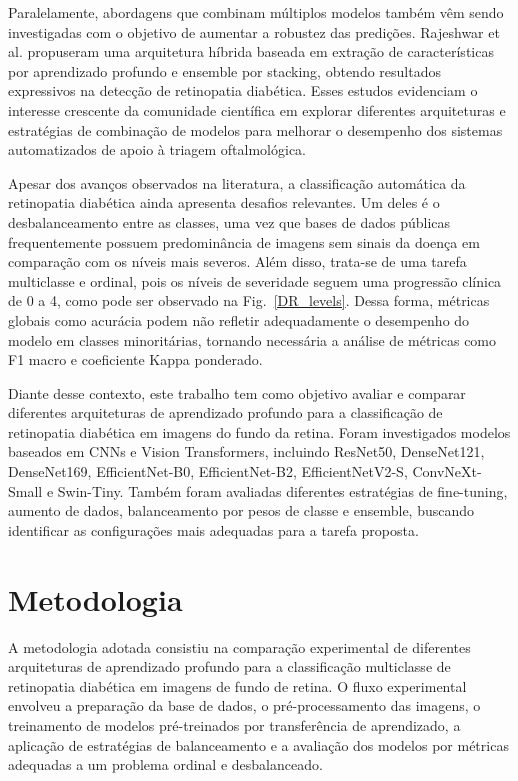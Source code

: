 \documentclass[conference]{IEEEtran}
\begin{document}
Paralelamente, abordagens que combinam múltiplos modelos também vêm
sendo investigadas com o objetivo de aumentar a robustez das
predições. Rajeshwar et al. \cite{rajeshwar2025} propuseram uma
arquitetura híbrida baseada em extração de características por
aprendizado profundo e ensemble por stacking, obtendo resultados
expressivos na detecção de retinopatia diabética. Esses estudos
evidenciam o interesse crescente da comunidade científica em explorar
diferentes arquiteturas e estratégias de combinação de modelos
para melhorar o desempenho dos sistemas automatizados de apoio à
triagem oftalmológica.

Apesar dos avanços observados na literatura, a classificação
automática da retinopatia diabética ainda apresenta desafios
relevantes. Um deles é o desbalanceamento entre as classes, uma vez
que bases de dados públicas frequentemente possuem predominância de
imagens sem sinais da doença em comparação com os níveis
mais severos. Além disso, trata-se de uma tarefa multiclasse e
ordinal, pois os níveis de severidade seguem uma progressão clínica
de 0 a 4, como pode ser observado na Fig.~\ref{DR_levels}. Dessa forma,
métricas globais como acurácia podem não refletir adequadamente o
desempenho do modelo em classes minoritárias, tornando necessária a
análise de métricas como F1 macro e coeficiente Kappa ponderado.

Diante desse contexto, este trabalho tem como objetivo avaliar e comparar
diferentes arquiteturas de aprendizado profundo para a classificação
de retinopatia diabética em imagens do fundo da retina. Foram
investigados modelos baseados em CNNs e Vision Transformers, incluindo
ResNet50, DenseNet121, DenseNet169, EfficientNet-B0, EfficientNet-B2,
EfficientNetV2-S, ConvNeXt-Small e Swin-Tiny. Também foram avaliadas
diferentes estratégias de fine-tuning, aumento de dados, balanceamento
por pesos de classe e ensemble, buscando identificar as configurações
mais adequadas para a tarefa proposta.

\section{Metodologia}

A metodologia adotada consistiu na comparação experimental de
diferentes arquiteturas de aprendizado profundo para a classificação
multiclasse de retinopatia diabética em imagens de fundo de retina.
O fluxo experimental envolveu a preparação da base de dados, o
pré-processamento das imagens, o treinamento de modelos pré-treinados
por transferência de aprendizado, a aplicação de estratégias
de balanceamento e a avaliação dos modelos por métricas
adequadas a um problema ordinal e desbalanceado.
\end{document}
